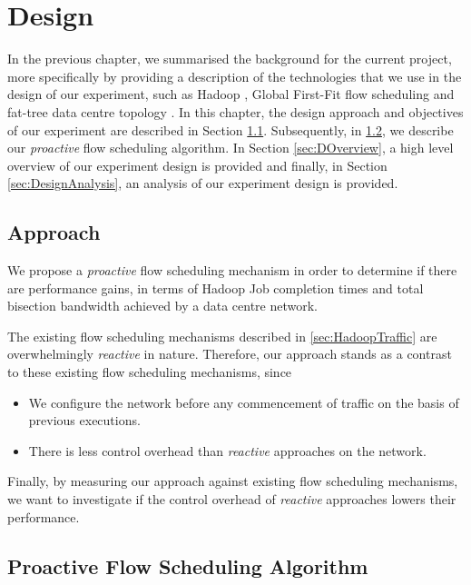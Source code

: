 \chapter{Design} \label{chap:design}
In the previous chapter, we summarised the background for the current project, more specifically by providing a description of the technologies that we use in the design of our experiment, such as Hadoop \cite{HadoopWeb}, Global First-Fit flow scheduling \cite{al2010hedera} and fat-tree data centre topology \cite{al2008scalable}. In this chapter, the design approach and objectives of our experiment are described in Section \ref{sec:DApproach}. Subsequently, in \ref{sec:ProactiveDesign}, we describe our \textit{proactive} flow scheduling algorithm. In Section \ref{sec:DOverview}, a high level overview of our experiment design is provided and finally, in Section \ref{sec:DesignAnalysis}, an analysis of our experiment design is provided.  

\section{Approach} \label{sec:DApproach}

We propose a \textit{proactive} flow scheduling mechanism in order to determine if there are performance gains, in terms of Hadoop \cite{HadoopWeb} Job completion times and total bisection bandwidth achieved by a data centre network. 

The existing flow scheduling mechanisms described in \ref{sec:HadoopTraffic} are overwhelmingly \textit{reactive} in nature. Therefore, our approach stands as a contrast to these existing flow scheduling mechanisms, since
\begin{itemize}
	\item We configure the network before any commencement of traffic on the basis of previous executions.
	\item There is less control overhead than \textit{reactive} approaches on the network.  
\end{itemize}

Finally, by measuring our approach against existing flow scheduling mechanisms, we want to investigate if the control overhead of \textit{reactive} approaches lowers their performance.

\section{Proactive Flow Scheduling Algorithm} \label{sec:ProactiveDesign}

